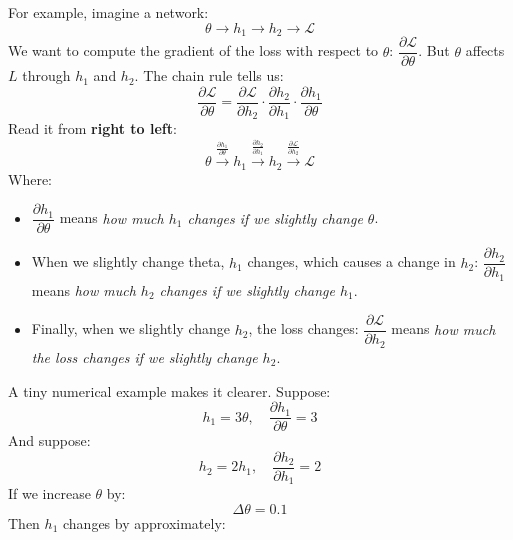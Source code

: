 \highspace
\begin{examplebox}
    For example, imagine a network:
    \begin{equation*}
        \theta \to h_1 \to h_2 \to \mathcal{L}
    \end{equation*}
    We want to compute the gradient of the loss with respect to $\theta$: $\dfrac{\partial\mathcal{L}}{\partial\theta}$.
    But $\theta$ affects $L$ through $h_1$ and $h_2$. The chain rule tells us:
    \begin{equation*}
        \frac{\partial\mathcal{L}}{\partial\theta}
        =
        \frac{\partial\mathcal{L}}{\partial h_2} \cdot
        \frac{\partial h_2}{\partial h_1} \cdot
        \frac{\partial h_1}{\partial\theta}
    \end{equation*}
    Read it from \textbf{right to left}:
    \begin{equation*}
        \theta \xrightarrow{\frac{\partial h_1}{\partial\theta}} h_1 \xrightarrow{\frac{\partial h_2}{\partial h_1}} h_2 \xrightarrow{\frac{\partial\mathcal{L}}{\partial h_2}} \mathcal{L}
    \end{equation*}
    Where:
    \begin{itemize}
        \item $\dfrac{\partial h_1}{\partial \theta}$ means \emph{how much $h_1$ changes if we slightly change $\theta$}.
        \item When we slightly change theta, $h_1$ changes, which causes a change in $h_2$: $\dfrac{\partial h_2}{\partial h_1}$ means \emph{how much $h_2$ changes if we slightly change $h_1$}.
        \item Finally, when we slightly change $h_2$, the loss changes: $\dfrac{\partial\mathcal{L}}{\partial h_2}$ means \emph{how much the loss changes if we slightly change $h_2$}.
    \end{itemize}
    A tiny numerical example makes it clearer. Suppose:
    \begin{equation*}
        h_1=3\theta, \quad \frac{\partial h_1}{\partial\theta}=3
    \end{equation*}
    And suppose:
    \begin{equation*}
        h_2=2h_1, \quad \frac{\partial h_2}{\partial h_1}=2
    \end{equation*}
    If we increase $\theta$ by:
    \begin{equation*}
        \Delta\theta=0.1
    \end{equation*}
    Then $h_1$ changes by approximately:

\end{examplebox}

